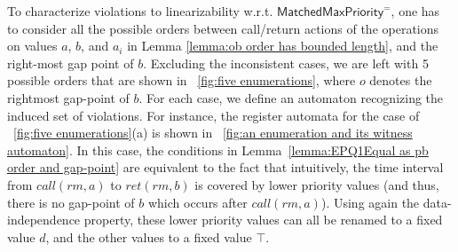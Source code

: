 \smallskip
To characterize violations to linearizability w.r.t. $\mathsf{MatchedMaxPriority}^{=}$, one has to consider all the possible orders between call/return actions of the operations on values $a$, $b$, and $a_i$ in Lemma \ref{lemma:ob order has bounded length}, and the right-most gap point of $b$. Excluding the inconsistent cases, we are left with 5 possible orders that are shown in \figurename~\ref{fig:five enumerations}, where $o$ denotes the rightmost gap-point of $b$.
For each case, we define an automaton recognizing the induced set of violations. For instance, the register automata for the case of \figurename~\ref{fig:five enumerations}(a) is shown in \figurename~\ref{fig:an enumeration and its witness automaton}. In this case, the conditions in Lemma~\ref{lemma:EPQ1Equal as pb order and gap-point} are equivalent to the fact that intuitively, the time interval from $\textit{call}(\textit{rm},a)$ to $\textit{ret}(\textit{rm},b)$ is covered by lower priority values (and thus, there is no gap-point of $b$ which occurs after $\textit{call}(\textit{rm},a)$). Using again the data-independence property, these lower priority values can all be renamed to a fixed value $d$, and the other values to a fixed value $\top$.





